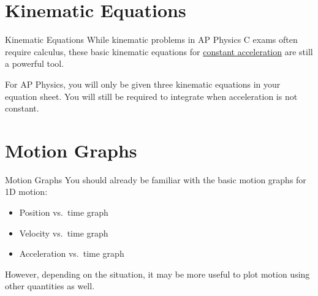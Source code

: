 \documentclass[12pt,compress,aspectratio=169]{beamer}
\begin{document}
\section{Kinematic Equations}

\begin{frame}{Kinematic Equations}
  While kinematic problems in AP Physics C exams often require calculus, these
  basic kinematic equations for \underline{constant acceleration} are still a
  powerful tool.

  \vspace{-.3in}{\Large
    \begin{align*}
      x &= x_0+ v_0t + \frac12at^2\\
      v &= v_0+at\\
      v^2 &= v_0^2+ 2a(x-x_0)
    \end{align*}
  }
    
  \vspace{-.1in}
  For AP Physics, you will only be given three kinematic equations in your
  equation sheet. You will still be required to integrate when acceleration is
  not constant.
\end{frame}



\section{Motion Graphs}

\begin{frame}{Motion Graphs}
  You should already be familiar with the basic motion graphs for 1D motion:
  \begin{itemize}
  \item Position vs.\ time graph
  \item Velocity vs.\ time graph
  \item Acceleration vs.\ time graph
  \end{itemize}

  However, depending on the situation, it may be more useful to plot motion
  using other quantities as well.
\end{frame}
\end{document}
